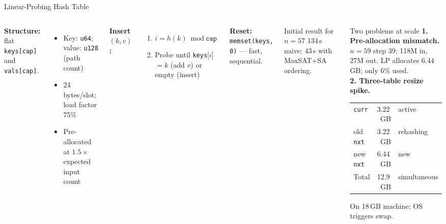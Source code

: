 \documentclass[aspectratio=169,t]{beamer}
\begin{document}
\begin{frame}{Linear-Probing Hash Table}
\small
\begin{columns}[c]
\textbf{Structure:} flat \texttt{keys[cap]} and \texttt{vals[cap]}.
\begin{itemize}
  \item Key: \texttt{u64}; value: \texttt{u128} (path count)
  \item 24 bytes/slot; load factor 75\%
  \item Pre-allocated at $1.5\times$ expected input count
\end{itemize}

\vspace{0.15cm}
\textbf{Insert $(k, v)$:}
\begin{enumerate}\small
  \item $i = h(k) \bmod \texttt{cap}$
  \item Probe until \texttt{keys}[$i$] $= k$ (add $v$) or empty (insert)
\end{enumerate}

\vspace{0.1cm}
\textbf{Reset:} \texttt{memset(keys, 0)} — fast, sequential.

\vspace{0.1cm}
\begin{exampleblock}{Initial result for $n=57$}
  134\,s naive; 43\,s with MaxSAT+SA ordering.
\end{exampleblock}

\begin{alertblock}{Two problems at scale}
  \textbf{1. Pre-allocation mismatch.}\\
  $n=59$ step 39: 118M in, 27M out.
  LP allocates $6.44$\,GB; only 6\% used.\\[4pt]
  \textbf{2. Three-table resize spike.}
  \begin{center}{\small
  \begin{tabular}{lrl}
  \texttt{curr} & 3.22\,GB & active \\
  old \texttt{nxt} & 3.22\,GB & rehashing \\
  new \texttt{nxt} & 6.44\,GB & \alert{new} \\
  \midrule
  Total & \alert{12.9\,GB} & simultaneous \\
  \end{tabular}}
  \end{center}
  On 18\,GB machine: OS triggers swap.
\end{alertblock}
\end{columns}
\end{frame}
\end{document}
